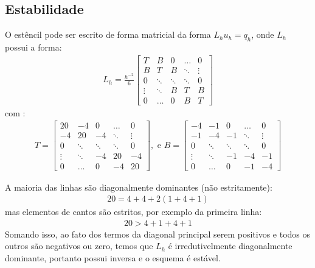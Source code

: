 \documentclass[]{article}
\begin{document}
\subsection{Estabilidade}

O estêncil pode ser escrito de forma matricial da forma $L_h u_h = q_h$, onde $L_h$ possui a forma:
\begin{align*}
    L_h = \frac{ h^{-2}   } 6 \left[
        \begin{array}{ccccc}
            T &B& 0 & \dots & 0 \\
            B& T & B & \ddots & \vdots \\
            0& \ddots &\ddots &\ddots& 0\\
            \vdots & \ddots& B & T & B\\
            0 & \dots & 0 & B& T
        \end{array}
    \right]
\end{align*}
com :
\begin{align*}
    T =  \left[
        \begin{array}{ccccc}
            20 &-4& 0 & \dots & 0 \\
            -4& 20 & -4 & \ddots & \vdots \\
            0& \ddots &\ddots &\ddots& 0\\
            \vdots & \ddots& -4 & 20 & -4\\
            0 & \dots & 0 & -4& 20
        \end{array}
    \right], \text{ e }
    B = 
    \left[
        \begin{array}{ccccc}
            -4 &-1& 0 & \dots & 0 \\
            -1& -4 & -1 & \ddots & \vdots \\
            0& \ddots &\ddots &\ddots& 0\\
            \vdots & \ddots& -1 & -4 & -1\\
            0 & \dots & 0 & -1& -4
        \end{array}
    \right]
\end{align*}

A maioria das linhas são diagonalmente dominantes (não estritamente):
\begin{align*}
    20 = 4 +4 + 2(1+4+1)
\end{align*}
mas elementos de cantos são estritos, por exemplo da primeira linha:
\begin{align*}
    20 > 4 + 1 + 4 +1
\end{align*}
Somando isso, ao fato dos termos da diagonal principal serem positivos e todos os outros são negativos ou zero, 
temos que $L_h$ é irredutivelmente diagonalmente dominante, portanto possui inversa e o esquema é estável.
\end{document}
